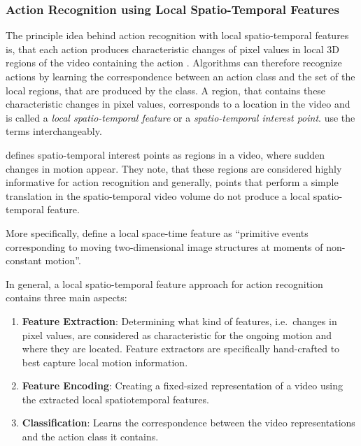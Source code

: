 \subsubsection{Action Recognition using Local Spatio-Temporal Features}
The principle idea behind action recognition with local spatio-temporal features is, that each action produces characteristic changes of pixel values in local 3D regions of the video containing the action \cite{poppe_survey_2010}.
Algorithms can therefore recognize actions by learning the correspondence between an action class and the set of the local regions, that are produced by the class.
A region, that contains these characteristic changes in pixel values, corresponds to a location in the video and is called a \textit{local spatio-temporal feature} or a \textit{spatio-temporal interest point}.
\textcite{aggarwal_human_2011} use the terms interchangeably.

\textcite{poppe_survey_2010} defines spatio-temporal interest points as regions in a video, where sudden changes in motion appear.
They note, that these regions are considered highly informative for action recognition and generally, points that perform a simple translation in the spatio-temporal video volume do not produce a local spatio-temporal feature.

More specifically, \textcite{schuldt_recognizing_2004} define a local space-time feature as ``primitive events corresponding to moving two-dimensional image structures at moments of non-constant motion''.


In general, a local spatio-temporal feature approach for action recognition contains three main aspects: \cite{karpathy_large-scale_2014}\cite{aggarwal_human_2011}
\begin{enumerate}
    \item \textbf{Feature Extraction}: Determining what kind of features, i.e.\ changes in pixel values, are considered as characteristic for the ongoing motion and where they are located. Feature extractors are specifically hand-crafted to best capture local motion information.
    \item \textbf{Feature Encoding}: Creating a fixed-sized representation of a video using the extracted local spatiotemporal features.
    \item \textbf{Classification}: Learns the correspondence between the video representations and the action class it contains.
\end{enumerate}

